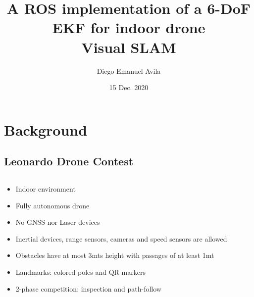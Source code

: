 \documentclass[serif,aspectratio=169]{beamer}
\title{A ROS implementation of a 6-DoF EKF for indoor drone \\Visual SLAM}
\author{Diego Emanuel Avila}
\date{15 Dec. 2020}
\begin{document}
    \begin{frame}
        \maketitle
    \end{frame}

    \section{Background}

    \subsection*{Leonardo Drone Contest}
    \begin{frame}
        \begin{columns}[T]
            \begin{column}{.6\textwidth}
               \begin{itemize}
                    \item{Indoor environment}
                    \item{Fully autonomous drone}
                    \item{No GNSS nor Laser devices}
                    \item{Inertial devices, range sensors, cameras and speed sensors are allowed}
                    \item{Obstacles
                        have at most 3mts height with passages of at least 1mt}
                    \item{Landmarks: colored poles and QR markers}
                    \item{2-phase competition: inspection and path-follow}
                \end{itemize}
            \end{column}
            \begin{column}{.4\textwidth}
            \end{column}
        \end{columns}
    \end{frame}
\end{document}
